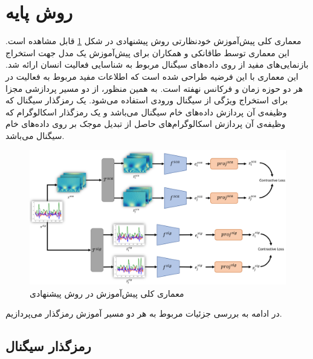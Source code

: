 \section{روش پایه}

معماری کلی پیش‌آموزش خودنظارتی روش پیشنهادی در شکل \ref{fig:proposed-method-pretraining}
قابل مشاهده است. این معماری توسط طاقانکی و همکاران\cite{taghanaki2023self}
برای پیش‌آموزش یک مدل جهت استخراج بازنمایی‌های مفید از روی داده‌های سیگنال مربوط به شناسایی فعالیت انسان ارائه شد. این معماری با این فرضیه طراحی شده است که اطلاعات مفید مربوط به فعالیت در هر دو حوزه زمان و فرکانس نهفته است. به همین منظور، از دو مسیر پردازشی مجزا برای استخراج ویژگی از سیگنال ورودی استفاده می‌شود. یک رمزگذار سیگنال که وظیفه‌ی آن پردازش داده‌های خام سیگنال می‌باشد و یک رمزگذار اسکالوگرام که وظیفه‌ی آن پردازش اسکالوگرام‌های حاصل از تبدیل موجک
بر روی داده‌های خام سیگنال می‌باشد.

\begin{figure}[ht]
\centering
\includegraphics[width=1\textwidth]{Images/Chapter3/proposed-method-pretraining.png}
\caption{معماری کلی پیش‌آموزش در روش پیشنهادی}
\label{fig:proposed-method-pretraining}
\end{figure}

در ادامه به بررسی جزئیات مربوط به هر دو مسیر آموزش رمزگذار می‌پردازیم.

\subsection{رمزگذار سیگنال}

